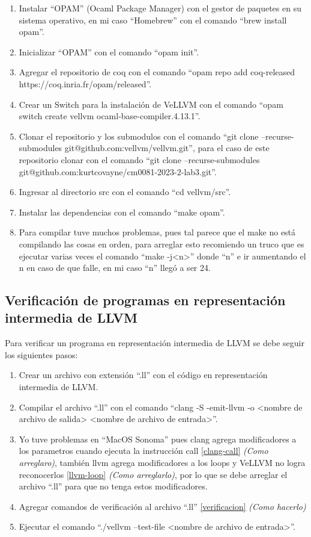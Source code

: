 \documentclass{hw-template}
\begin{document}
\begin{enumerate}
    \item Instalar ``OPAM'' \cite{opam} (Ocaml Package Manager) con el gestor
    de paquetes en su sistema operativo, en mi caso ``Homebrew'' \cite{homebrew}
    con el comando ``brew install opam''.
    \item Inicializar ``OPAM'' con el comando ``opam init''.
    \item Agregar el repositorio de coq con el comando ``opam repo
    add coq-released https://coq.inria.fr/opam/released''.
    \item Crear un Switch para la instalación de VeLLVM con el comando 
    ``opam switch create vellvm ocaml-base-compiler.4.13.1''.
    \item Clonar el repositorio y los submodulos con el comando 
    ``git clone --recurse-submodules git@github.com:vellvm/vellvm.git'', para el
     caso de este repositorio clonar con el comando ``git clone --recurse-submodules
      git@github.com:kurtcovayne/cm0081-2023-2-lab3.git''.
    \item Ingresar al directorio src con el comando ``cd vellvm/src''.
    \item Instalar las dependencias con el comando ``make opam''.
    \item Para compilar tuve muchos problemas, pues tal parece que el make no está
    compilando las cosas en orden, para arreglar esto recomiendo un truco que es
    ejecutar varias veces el comando ``make -j<n>'' donde ``n'' e ir aumentando
    el n en caso de que falle, en mi caso ``n'' llegó a ser 24.
\end{enumerate}

\subsection{Verificación de programas en representación intermedia de LLVM}
Para verificar un programa en representación intermedia de LLVM se debe seguir los siguientes pasos:
\begin{enumerate}
    \item Crear un archivo con extensión ``.ll'' con el código en representación
    intermedia de LLVM.
    \item Compilar el archivo ``.ll'' con el comando ``clang -S -emit-llvm -o
    <nombre de archivo de salida> <nombre de archivo de entrada>''.
    \item Yo tuve problemas en ``MacOS Sonoma'' pues clang agrega modificadores
    a los parametros cuando ejecuta la instrucción call
    \ref{clang-call}{\color{blue} \textit{(Como arreglaro)}}, también llvm agrega
    modificadores a los loops y VeLLVM no logra reconocerlos
    \ref{llvm-loop}{\color{blue} \textit{(Como arreglarlo)}}, por lo que se debe
    arreglar el archivo ``.ll'' para que no tenga estos modificadores.
    \item Agregar comandos de verificación al archivo ``.ll''
    \ref{verificacion}{\color{blue} \textit{(Como hacerlo)}}
    \item Ejecutar el comando ``./vellvm --test-file <nombre de archivo de entrada>''.
\end{enumerate}
\end{document}
